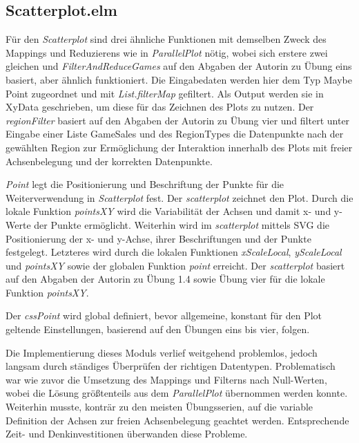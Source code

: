 \documentclass[usegeometry=true]{scrartcl}
\begin{document}
\subsection{Scatterplot.elm}
Für den \textit{Scatterplot} sind drei ähnliche Funktionen mit demselben Zweck des Mappings und Reduzierens wie in \textit{ParallelPlot} nötig,
wobei sich erstere zwei gleichen und \textit{FilterAndReduceGames} auf den Abgaben der Autorin zu Übung eins basiert, aber ähnlich funktioniert.
Die Eingabedaten werden hier dem Typ Maybe Point zugeordnet und mit \textit{List.filterMap} gefiltert.
Als Output werden sie in XyData geschrieben, um diese für das Zeichnen des Plots zu nutzen.
Der \textit{regionFilter} basiert auf den Abgaben der Autorin zu Übung vier und filtert unter Eingabe einer Liste GameSales und des RegionTypes 
die Datenpunkte nach der gewählten Region zur Ermöglichung der Interaktion innerhalb des Plots mit freier Achsenbelegung 
und der korrekten Datenpunkte.

\textit{Point} legt die Positionierung und Beschriftung der Punkte für die Weiterverwendung in \textit{Scatterplot} fest.
Der \textit{scatterplot} zeichnet den Plot. 
Durch die lokale Funktion \textit{pointsXY} wird die Variabilität der Achsen und damit x- und y-Werte der Punkte ermöglicht.
Weiterhin wird im \textit{scatterplot} mittels SVG die Positionierung der x- und y-Achse, ihrer Beschriftungen und der Punkte festgelegt. 
Letzteres wird durch die lokalen Funktionen \textit{xScaleLocal}, \textit{yScaleLocal} und \textit{pointsXY} sowie der globalen Funktion \textit{point} erreicht.
Der \textit{scatterplot} basiert auf den Abgaben der Autorin zu Übung 1.4 sowie Übung vier für die lokale Funktion \textit{pointsXY}. 

Der \textit{cssPoint} wird global definiert, bevor allgemeine, konstant für den Plot geltende Einstellungen, 
basierend auf den Übungen eins bis vier, folgen. 

Die Implementierung dieses Moduls verlief weitgehend problemlos, jedoch langsam durch ständiges Überprüfen der richtigen Datentypen.
Problematisch war wie zuvor die Umsetzung des Mappings und Filterns nach Null-Werten, wobei die Lösung größtenteils aus dem \textit{ParallelPlot} übernommen werden konnte. 
Weiterhin musste, konträr zu den meisten Übungsserien, auf die variable Definition der Achsen zur freien Achsenbelegung geachtet werden.
Entsprechende Zeit- und Denkinvestitionen überwanden diese Probleme.
\end{document}
